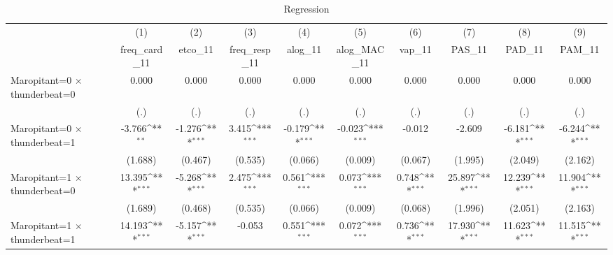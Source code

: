 \begin{table}[htbp]\centering
\def\sym#1{\ifmmode^{#1}\else\(^{#1}\)\fi}
\caption{Regression}
\begin{tabular}{l*{9}{c}}
\toprule
                    &\multicolumn{1}{c}{(1)}&\multicolumn{1}{c}{(2)}&\multicolumn{1}{c}{(3)}&\multicolumn{1}{c}{(4)}&\multicolumn{1}{c}{(5)}&\multicolumn{1}{c}{(6)}&\multicolumn{1}{c}{(7)}&\multicolumn{1}{c}{(8)}&\multicolumn{1}{c}{(9)}\\
                    &\multicolumn{1}{c}{freq\_card\_11}&\multicolumn{1}{c}{etco\_11}&\multicolumn{1}{c}{freq\_resp\_11}&\multicolumn{1}{c}{alog\_11}&\multicolumn{1}{c}{alog\_MAC\_11}&\multicolumn{1}{c}{vap\_11}&\multicolumn{1}{c}{PAS\_11}&\multicolumn{1}{c}{PAD\_11}&\multicolumn{1}{c}{PAM\_11}\\
\midrule
Maropitant=0 $\times$ thunderbeat=0&       0.000         &       0.000         &       0.000         &       0.000         &       0.000         &       0.000         &       0.000         &       0.000         &       0.000         \\
                    &         (.)         &         (.)         &         (.)         &         (.)         &         (.)         &         (.)         &         (.)         &         (.)         &         (.)         \\
\addlinespace
Maropitant=0 $\times$ thunderbeat=1&      -3.766\sym{**} &      -1.276\sym{***}&       3.415\sym{***}&      -0.179\sym{***}&      -0.023\sym{***}&      -0.012         &      -2.609         &      -6.181\sym{***}&      -6.244\sym{***}\\
                    &     (1.688)         &     (0.467)         &     (0.535)         &     (0.066)         &     (0.009)         &     (0.067)         &     (1.995)         &     (2.049)         &     (2.162)         \\
\addlinespace
Maropitant=1 $\times$ thunderbeat=0&      13.395\sym{***}&      -5.268\sym{***}&       2.475\sym{***}&       0.561\sym{***}&       0.073\sym{***}&       0.748\sym{***}&      25.897\sym{***}&      12.239\sym{***}&      11.904\sym{***}\\
                    &     (1.689)         &     (0.468)         &     (0.535)         &     (0.066)         &     (0.009)         &     (0.068)         &     (1.996)         &     (2.051)         &     (2.163)         \\
\addlinespace
Maropitant=1 $\times$ thunderbeat=1&      14.193\sym{***}&      -5.157\sym{***}&      -0.053         &       0.551\sym{***}&       0.072\sym{***}&       0.736\sym{***}&      17.930\sym{***}&      11.623\sym{***}&      11.515\sym{***}\\

\end{tabular}
\end{table}

